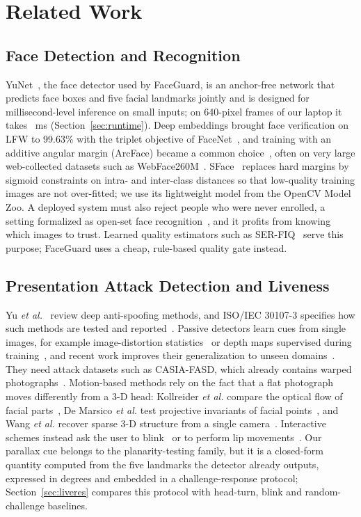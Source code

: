\documentclass[journal]{IEEEtran}
\newcommand{\sys}{FaceGuard}
\begin{document}
\section{Related Work}\label{sec:related}

\subsection{Face Detection and Recognition}
YuNet~\cite{wu2023yunet}, the face detector used by \sys{}, is an anchor-free network that predicts face boxes and five facial landmarks jointly and is designed for millisecond-level inference on small inputs; on 640-pixel frames of our laptop it takes \rtDet~ms (Section~\ref{sec:runtime}). Deep embeddings brought face verification on LFW to 99.63\% with the triplet objective of FaceNet~\cite{schroff2015facenet}, and training with an additive angular margin (ArcFace) became a common choice~\cite{deng2019arcface}, often on very large web-collected datasets such as WebFace260M~\cite{zhu2021webface260m}. SFace~\cite{zhong2021sface} replaces hard margins by sigmoid constraints on intra- and inter-class distances so that low-quality training images are not over-fitted; we use its lightweight model from the OpenCV Model Zoo. A deployed system must also reject people who were never enrolled, a setting formalized as open-set face recognition~\cite{gunther2017openset}, and it profits from knowing which images to trust. Learned quality estimators such as SER-FIQ~\cite{terhorst2020serfiq} serve this purpose; \sys{} uses a cheap, rule-based quality gate instead.

\subsection{Presentation Attack Detection and Liveness}
Yu \emph{et al.}~\cite{yu2023fassurvey} review deep anti-spoofing methods, and ISO/IEC 30107-3 specifies how such methods are tested and reported~\cite{iso30107-3}. Passive detectors learn cues from single images, for example image-distortion statistics~\cite{wen2015ida} or depth maps supervised during training~\cite{liu2018auxiliary}, and recent work improves their generalization to unseen domains~\cite{wang2022ssan}. They need attack datasets such as CASIA-FASD, which already contains warped photographs~\cite{zhang2012casiafasd}. Motion-based methods rely on the fact that a flat photograph moves differently from a 3-D head: Kollreider \emph{et al.} compare the optical flow of facial parts~\cite{kollreider2007motion}, De Marsico \emph{et al.} test projective invariants of facial points~\cite{demarsico2012projective}, and Wang \emph{et al.} recover sparse 3-D structure from a single camera~\cite{wang2013structure}. Interactive schemes instead ask the user to blink~\cite{pan2007eyeblink} or to perform lip movements~\cite{zhou2024lipmotion}. Our parallax cue belongs to the planarity-testing family, but it is a closed-form quantity computed from the five landmarks the detector already outputs, expressed in degrees and embedded in a challenge-response protocol; Section~\ref{sec:liveres} compares this protocol with head-turn, blink and random-challenge baselines.
\end{document}
